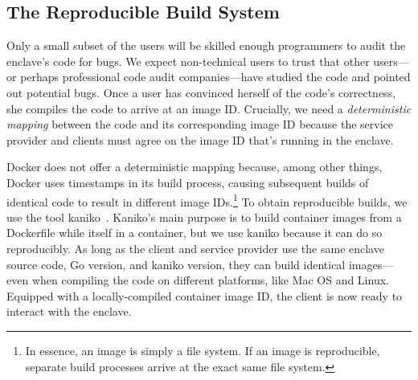 

\subsection{The Reproducible Build System}
\label{sec:build-system}

Only a small subset of the users will be skilled enough programmers to audit
the enclave's code for bugs.  We expect non-technical users to trust that other
users---or perhaps professional code audit companies---have studied the code
and pointed out potential bugs.  Once a user has convinced herself of the code's
correctness, she compiles the code to arrive at an image ID.  Crucially, we
need a \emph{deterministic mapping} between the code and its corresponding
image ID because the service provider and clients must agree on the image ID
that's running in the enclave.

Docker does not offer a deterministic mapping because, among other things,
Docker uses timestamps in its build process, causing subsequent builds of
identical code to result in different image IDs.\footnote{In essence, an image
is simply a file system.  If an image is reproducible, separate build processes
arrive at the exact same file system.}  To obtain reproducible builds, we use
the tool kaniko~\cite{kaniko}.  Kaniko's main purpose is to build container
images from a Dockerfile while itself in a container, but we use kaniko because
it can do so reproducibly.  As long as the client and service provider use the
same enclave source code, Go version, and kaniko version, they can build
identical images---even when compiling the code on different platforms, like
Mac OS and Linux.  Equipped with a locally-compiled container image ID, the
client is now ready to interact with the enclave.

